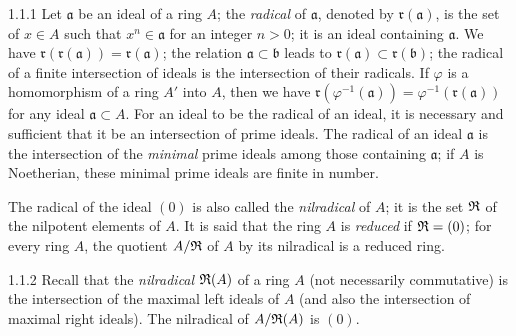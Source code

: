 \documentclass[../main.tex]{subfiles}
\begin{document}
\begin{env}{1.1.1}
Let $\mathfrak{a}$ be an ideal of a ring $A$; the \emph{radical} of $\mathfrak{a}$, denoted
by $\mathfrak{r}(\mathfrak{a})$, is the set of $x\in A$ such that $x^n\in\mathfrak{a}$ for
an integer $n>0$; it is an ideal containing $\mathfrak{a}$. We have
$\mathfrak{r}(\mathfrak{r}(\mathfrak{a}))=\mathfrak{r}(\mathfrak{a})$; the relation
$\mathfrak{a}\subset\mathfrak{b}$ leads to $\mathfrak{r}(\mathfrak{a})\subset\mathfrak{r}(\mathfrak{b})$;
the radical of a finite intersection of ideals is the intersection of their radicals. If $\varphi$
is a homomorphism of a ring $A'$ into $A$, then we have
$\mathfrak{r}(\varphi^{-1}(\mathfrak{a}))=\varphi^{-1}(\mathfrak{r}(\mathfrak{a}))$
for any ideal $\mathfrak{a}\subset A$. For an ideal to be the radical of an ideal,
it is necessary and sufficient that it be an intersection of prime ideals. The radical of an
ideal $\mathfrak{a}$ is the intersection of the
\emph{minimal} prime ideals among those containing $\mathfrak{a}$; if $A$ is
Noetherian, these minimal prime ideals are finite in number.

The radical of the ideal $(0)$ is also called the \emph{nilradical} of $A$; it is the set
$\mathfrak{R}$ of the nilpotent elements of $A$. It is said that the ring $A$ is \emph{reduced} if
$\mathfrak{R}=(0)$; for every ring $A$, the quotient $A/\mathfrak{R}$ of $A$ by its nilradical is a
reduced ring.
\end{env}

\begin{env}{1.1.2}
Recall that the \emph{nilradical} $\mathfrak{R}(A)$ of a ring $A$ (not necessarily commutative) is the
intersection of the maximal left ideals of $A$ (and also the intersection of maximal
right ideals). The nilradical of $A/\mathfrak{R}(A)$ is $(0)$.
\end{env}
\end{document}
